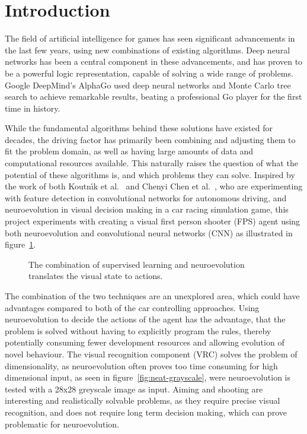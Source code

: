 
\section{Introduction}
The field of artificial intelligence for games has seen significant advancements in the last few years, using new combinations of existing algorithms. Deep neural networks has been a central component in these advancements, and has proven to be a powerful logic representation, capable of solving a wide range of problems. Google DeepMind's AlphaGo\cite{christian} used deep neural networks and Monte Carlo tree search to achieve remarkable results, beating a professional Go player for the first time in history.

While the fundamental algorithms behind these solutions have existed for decades, the driving factor has primarily been combining and adjusting them to fit the problem domain, as well as having large amounts of data and computational resources available. This naturally raises the question of what the potential of these algorithms is, and which problems they can solve. Inspired by the work of both Koutn\'{\i}k et al.~\cite{torcs} and Chenyi Chen et al.~\cite{chen}, who are experimenting with feature detection in convolutional networks for autonomous driving, and neuroevolution in visual decision making in a car racing simulation game, this project experiments with creating a visual first person shooter (FPS) agent using both neuroevolution and convolutional neural networks (CNN) as illustrated in figure~\ref{fig:architecture}.


\begin{figure}[h]
	\vspace{-5mm}
	\begin{scriptsize}
		\sffamily
		\def\svgwidth{\textwidth}
		
		\vspace{-45mm}
	\end{scriptsize}
	\caption[Overview of the architecture of the solution]{The combination of supervised learning and neuroevolution translates the visual state to actions.}
	\label{fig:architecture}
\end{figure}

The combination of the two techniques are an unexplored area, which could have advantages compared to both of the car controlling approaches. Using neuroevolution to decide the actions of the agent has the advantage, that the problem is solved without having to explicitly program the rules, thereby potentially consuming fewer development resources and allowing evolution of novel behaviour. The visual recognition component (VRC) solves the problem of dimensionality, as neuroevolution often proves too time consuming for high dimensional input, as seen in figure~\ref{fig:neat-grayscale}, were neuroevolution is tested with a 28x28 greyscale image as input. Aiming and shooting are interesting and realistically solvable problems, as they require precise visual recognition, and does not require long term decision making, which can prove problematic for neuroevolution.

